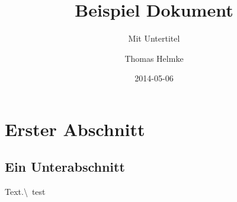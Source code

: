 \documentclass{scrartcl}
\title{Beispiel Dokument}
\subtitle{Mit Untertitel}
\author{Thomas Helmke}
\date{2014-05-06}
\begin{document}
\maketitle
\section{Erster Abschnitt}
\subsection{Ein Unterabschnitt}
Text.\textbackslash\ \hspace{2ex}test
\end{document}
